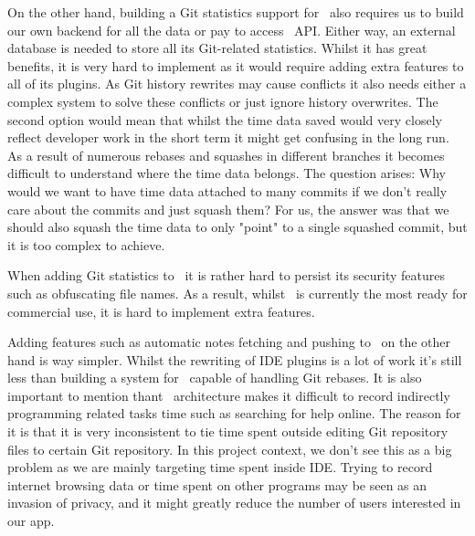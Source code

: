 On the other hand, building a Git statistics support for~ also requires us to build our own backend
for all the data or pay to access~ API.
Either way, an external database is needed to store all its Git-related statistics.
Whilst it has great benefits, it is very hard to implement as it would require adding extra features to all of its plugins.
As Git history rewrites may cause conflicts it also needs either a complex system to solve these conflicts or just ignore history overwrites.
The second option would mean that whilst the time data saved would very closely reflect developer work in the short term it might get
confusing in the long run.
As a result of numerous rebases and squashes in different branches it becomes difficult to understand where the time data belongs.
The question arises: Why would we want to have time data attached to many commits if we don't really care about the commits and just squash them?
For us, the answer was that we should also squash the time data to only "point" to a single squashed commit, but it is too complex to achieve.

When adding Git statistics to~ it is rather hard to persist its security features such as obfuscating file names.
As a result, whilst~ is currently the most ready for commercial use, it is hard to implement extra features.

Adding features such as automatic notes fetching and pushing to~ on the other hand is way simpler.
Whilst the rewriting of IDE plugins is a lot of work it's still less than building a system for~ capable of handling Git rebases.
It is also important to mention thant~ architecture makes it difficult to record indirectly programming related tasks time
such as searching for help online.
The reason for it is that it is very inconsistent to tie time spent outside editing Git repository files to certain Git repository.
In this project context, we don't see this as a big problem as we are mainly targeting time spent inside IDE.
Trying to record internet browsing data or time spent on other programs may be seen as an invasion of privacy,
and it might greatly reduce the number of users interested in our app.
